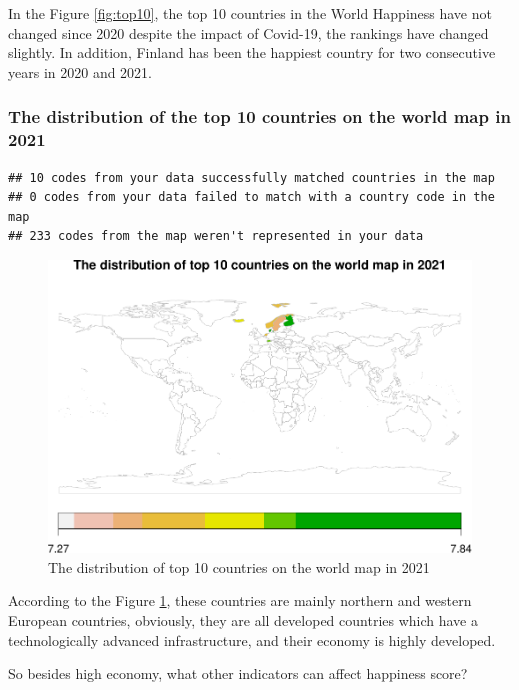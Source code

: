 \documentclass[11pt,a4paper,]{article}
\begin{document}
In the Figure \ref{fig:top10}, the top 10 countries in the World Happiness have not changed since 2020 despite the impact of Covid-19, the rankings have changed slightly.
In addition, Finland has been the happiest country for two consecutive years in 2020 and 2021.

\hypertarget{the-distribution-of-the-top-10-countries-on-the-world-map-in-2021}{%
\subsubsection{The distribution of the top 10 countries on the world map in 2021}\label{the-distribution-of-the-top-10-countries-on-the-world-map-in-2021}}

\begin{verbatim}
## 10 codes from your data successfully matched countries in the map
## 0 codes from your data failed to match with a country code in the map
## 233 codes from the map weren't represented in your data
\end{verbatim}

\begin{figure}
\centering
\includegraphics{Assignment4_files/figure-latex/top10map-1.pdf}
\caption{\label{fig:top10map}The distribution of top 10 countries on the world map in 2021}
\end{figure}

According to the Figure \ref{fig:top10map}, these countries are mainly northern and western European countries, obviously, they are all developed countries which have a technologically advanced infrastructure, and their economy is highly developed.

So besides high economy, what other indicators can affect happiness score?
\end{document}
